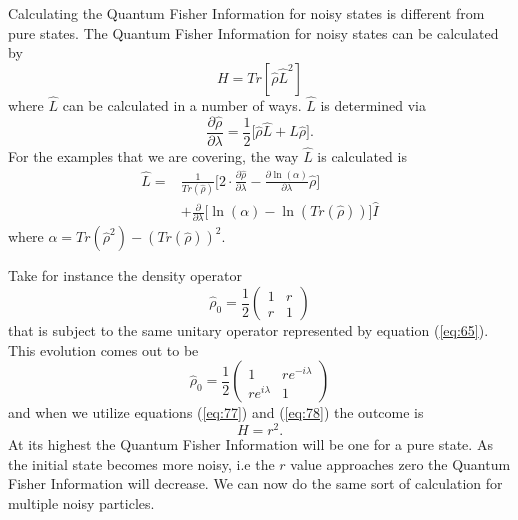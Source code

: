 \documentclass[twocolumn]{article}
\begin{document}
Calculating the Quantum Fisher Information for noisy states is different from pure states. The Quantum Fisher Information for noisy states can be calculated by
\begin{equation} \label{eq:77}
H=Tr[\hat{\rho}\hat{L}^2]
\end{equation}
where $\hat{L}$ can be calculated in a number of ways. $\hat{L}$ is determined via
\begin{equation}\label{eq:78}
\frac{\partial\hat{\rho}}{\partial\lambda}=\frac{1}{2}\big[\hat{\rho}\hat{L}+\hat{L}\hat{\rho}\big].
\end{equation}
For the examples that we are covering, the way $\hat{L}$ is calculated is
\begin{align} \label{eq:79}
\hat{L}=&\frac{1}{Tr(\hat{\rho})}\Big[2\cdot\frac{\partial\hat{\rho}}{\partial\lambda}-\frac{\partial \ln(\alpha)}{\partial\lambda}\hat{\rho}\Big] \nonumber \\
&+\frac{\partial}{\partial\lambda}\Big[\ln(\alpha)-\ln(Tr(\hat{\rho}))\Big]\hat{I}
\end{align}
\cite{D. Collins} where $\alpha=Tr{(\hat{\rho}^2)}-(Tr(\hat{\rho}))^2$.

Take for instance the density operator
\begin{equation} \label{eq:80}
\hat{\rho}_0=\frac{1}{2}
\begin{pmatrix}
1 & r \\
r & 1
\end{pmatrix}
\end{equation}
that is subject to the same unitary operator represented by equation (\ref{eq:65}). This evolution comes out to be
\begin{equation} \label{eq:81}
\hat{\rho}_0=\frac{1}{2}
\begin{pmatrix}
1 & re^{-i\lambda}\\
re^{i\lambda} & 1
\end{pmatrix}
\end{equation}
and when we utilize equations (\ref{eq:77}) and (\ref{eq:78}) the outcome is
\begin{equation} \label{eq:82}
H=r^2.
\end{equation}
At its highest the Quantum Fisher Information will be one for a pure state. As the initial state becomes more noisy, i.e the $r$ value approaches zero the Quantum Fisher Information will decrease.  We can now do the same sort of calculation for multiple noisy particles.
\end{document}
